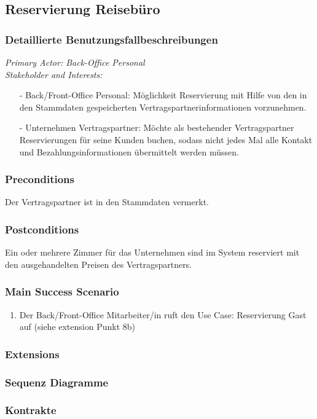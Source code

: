 \documentclass[./detailed_overview_usecases.tex]{subfiles}
\begin{document}
    \subsection{Reservierung Reisebüro}
    \subsubsection{Detaillierte Benutzungsfallbeschreibungen}

    \textit{Primary Actor: Back-Office Personal}
    \\
    \textit{Stakeholder and Interests:}
    \begin{itemize}
        \item[-] Back/Front-Office Personal: Möglichkeit Reservierung mit Hilfe von den in den Stammdaten gespeicherten Vertragspartnerinformationen vorzunehmen.
        \item[-] Unternehmen Vertragspartner: Möchte als bestehender Vertragspartner Reservierungen für seine Kunden buchen, sodass nicht jedes Mal alle Kontakt und Bezahlungsinformationen übermittelt werden müssen.
    \end{itemize}

    \subsubsection*{Preconditions}
    Der Vertragspartner ist in den Stammdaten vermerkt.

    \subsubsection*{Postconditions}
    Ein oder mehrere Zimmer für das Unternehmen sind im System reserviert mit den ausgehandelten Preisen des Vertragspartners.

    \subsubsection*{Main Success Scenario}
    \begin{enumerate}
        \item Der Back/Front-Office Mitarbeiter/in ruft den Use Case: Reservierung Gast auf (siehe extension Punkt 8b)
    \end{enumerate}

    \subsubsection*{Extensions}
    \item

    \subsubsection{Sequenz Diagramme}
    \subsubsection{Kontrakte}
\end{document}

